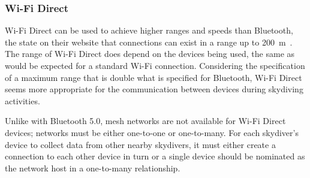 \subsubsection{Wi-Fi Direct}\label{subsubsec:wifi-direct} %

Wi-Fi Direct can be used to achieve higher ranges and speeds than Bluetooth, the \citeauthor{wi-fi_alliance_wi-fi_????} state on their website that connections can exist in a range up to \SI{200}{\metre}~\cite{wi-fi_alliance_wi-fi_????}. The range of Wi-Fi Direct does depend on the devices being used, the same as would be expected for a standard Wi-Fi connection. Considering the specification of a maximum range that is double what is specified for Bluetooth, Wi-Fi Direct seems more appropriate for the communication between devices during skydiving activities.

Unlike with Bluetooth 5.0, mesh networks are not available for Wi-Fi Direct devices; networks must be either one-to-one or one-to-many. For each skydiver's device to collect data from other nearby skydivers, it must either create a connection to each other device in turn or a single device should be nominated as the network host in a one-to-many relationship.
